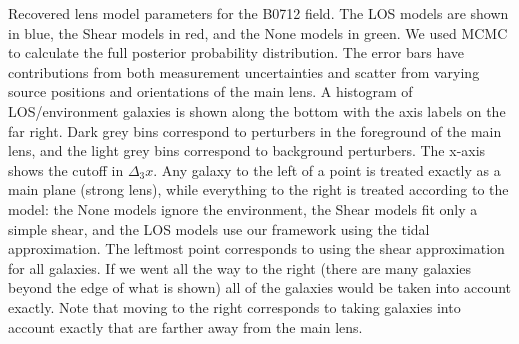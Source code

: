 \label{B0712} Recovered lens model parameters for the B0712 field. The LOS models are shown in blue, the Shear models in red, and the None models in green. We used MCMC to calculate the full posterior probability distribution. The error bars have contributions from both measurement uncertainties and scatter from varying source positions and orientations of the main lens. A histogram of LOS/environment galaxies is shown along the bottom with the axis labels on the far right. Dark grey bins correspond to perturbers in the foreground of the main lens, and the light grey bins correspond to background perturbers. The x-axis shows the cutoff in $\Delta_3 x$. Any galaxy to the left of a point is treated exactly as a main plane (strong lens), while everything to the right is treated according to the model: the None models ignore the environment, the Shear models fit only a simple shear, and the LOS models use our framework using the tidal approximation. The leftmost point corresponds to using the shear approximation for all galaxies. If we went all the way to the right (there are many galaxies beyond the edge of what is shown) all of the galaxies would be taken into account exactly. Note that moving to the right corresponds to taking galaxies into account exactly that are farther away from the main lens.
